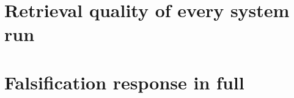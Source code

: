 \documentclass[11pt]{article}
\begin{document}


\appendix

\section{Retrieval quality of every system run}
\label{app:retrieval}

\begin{table}[t]
\centering
{}
\caption{Retrieval quality of every system run. The four above the rule carry the matched comparison; their ranking differs between datasets and their spread is far larger on HotpotQA. jina-embeddings-v3 is reported separately (Section~\ref{sec:control}): it sits inside the band on HotpotQA but is the weakest system by ten points on Natural Questions, where it triples the spread and fails TOST equivalence against all four at $\pm$0.02.}
\label{tab:1}
\end{table}

\section{Falsification response in full}
\label{app:falsification}
\end{document}
